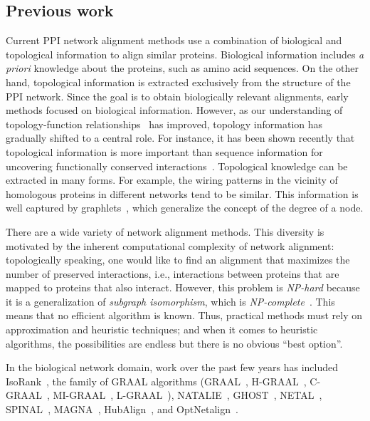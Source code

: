 \documentclass{bioinfo}
\begin{document}
\subsection{Previous work}\label{state}
Current PPI network alignment methods use a combination of biological and topological information to align similar proteins. Biological information includes \textit{a priori} knowledge about the proteins, such as amino acid sequences. On the other hand, topological information is extracted exclusively from the structure of the PPI network. Since the goal is to obtain biologically relevant alignments, early methods focused on biological information. However, as our understanding of topology-function
relationships~\citep{functionTopologyRelationship} has improved, topology information has gradually shifted to a central role. For instance, it has been shown recently that topological information is more important than sequence information for uncovering functionally conserved interactions~\citep{LGRAAL}.
Topological knowledge can be extracted in many forms. For example, the wiring patterns in the vicinity of homologous proteins in different networks tend to be similar. This information is well captured by graphlets~\citep{Przulj12122004}, which generalize the concept of the degree of a node.

There are a wide variety of network alignment methods. This diversity is motivated by the inherent computational complexity of network alignment: topologically speaking, one would like to find an alignment that maximizes the number of preserved interactions, i.e., interactions between proteins that are mapped to proteins that also interact. However, this problem is \textit{NP-hard} because it is a generalization of \textit{subgraph isomorphism}, which is \textit{NP-complete}~\citep{Cook:1971:CTP:800157.805047}. This means that no efficient algorithm is known. Thus, practical methods must rely on approximation and heuristic techniques; and when it comes to heuristic algorithms, the possibilities are endless but there is no obvious ``best option''.

In the biological network domain, work over the past few years has included IsoRank~\citep{Isorank}, the family of GRAAL algorithms (GRAAL~\citep{GRAAL}, H-GRAAL~\citep{HGRAAL}, C-GRAAL~\citep{CGRAAL}, MI-GRAAL~\citep{MIGRAAL}, L-GRAAL~\citep{LGRAAL}), NATALIE~\citep{NATALIE}, GHOST~\citep{GHOST}, NETAL~\citep{NETAL}, SPINAL~\citep{SPINAL}, MAGNA~\citep{MAGNA}, HubAlign~\citep{HubAlign}, and OptNetalign~\citep{optnetalign}. 
\end{document}

